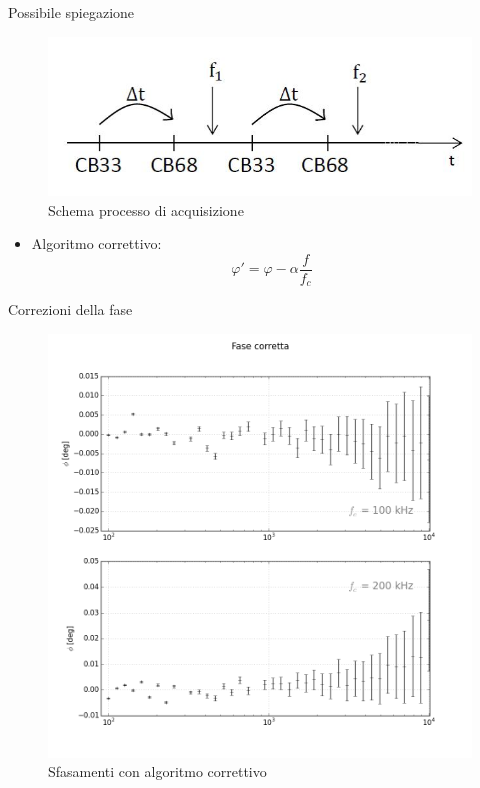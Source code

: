 \documentclass{beamer}
\begin{document}
\begin{frame}{Possibile spiegazione}
\begin{figure}
\centering
\includegraphics[width=0.7\linewidth]{immagine}
\caption{Schema processo di acquisizione}
\label{fig:schema}
\end{figure}
\begin{itemize}

\begin{definition}
$\Delta \varphi = \Delta tf$, $\Delta t = \frac{\alpha}{f_c}$, $\alpha = 179.97 \pm 0.11$
\end{definition}

\item Algoritmo correttivo:\\
\begin{equation}
\varphi ' = \varphi - \alpha \frac{f}{f_c}
\end{equation}
\end{itemize}
\end{frame}

\begin{frame}{Correzioni della fase}
\begin{figure}
\includegraphics[width=0.6\linewidth]{subplots_errors}
\caption{Sfasamenti con algoritmo correttivo}
\label{fig:sfasacorret}
\end{figure}
\end{frame}
\end{document}
